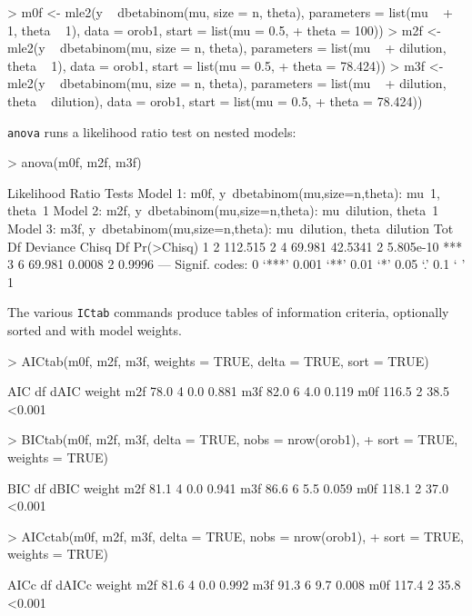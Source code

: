 \documentclass{article}
\newcommand{\code}[1]{{\tt #1}}
\begin{document}
\begin{Schunk}
\begin{Sinput}
> m0f <- mle2(y ~ dbetabinom(mu, size = n, theta), parameters = list(mu ~ 
+     1, theta ~ 1), data = orob1, start = list(mu = 0.5, 
+     theta = 100))
> m2f <- mle2(y ~ dbetabinom(mu, size = n, theta), parameters = list(mu ~ 
+     dilution, theta ~ 1), data = orob1, start = list(mu = 0.5, 
+     theta = 78.424))
> m3f <- mle2(y ~ dbetabinom(mu, size = n, theta), parameters = list(mu ~ 
+     dilution, theta ~ dilution), data = orob1, start = list(mu = 0.5, 
+     theta = 78.424))
\end{Sinput}
\end{Schunk}

\code{anova} runs a likelihood ratio test on nested
models:
\begin{Schunk}
\begin{Sinput}
> anova(m0f, m2f, m3f)
\end{Sinput}
\begin{Soutput}
Likelihood Ratio Tests
Model 1: m0f, y~dbetabinom(mu,size=n,theta): mu~1, theta~1
Model 2: m2f, y~dbetabinom(mu,size=n,theta): mu~dilution, theta~1
Model 3: m3f, y~dbetabinom(mu,size=n,theta): mu~dilution,
          theta~dilution
  Tot Df Deviance   Chisq Df Pr(>Chisq)    
1      2  112.515                          
2      4   69.981 42.5341  2  5.805e-10 ***
3      6   69.981  0.0008  2     0.9996    
---
Signif. codes:  0 ‘***’ 0.001 ‘**’ 0.01 ‘*’ 0.05 ‘.’ 0.1 ‘ ’ 1 
\end{Soutput}
\end{Schunk}

The various \code{ICtab} commands produce tables of
information criteria, optionally sorted and
with model weights.
\begin{Schunk}
\begin{Sinput}
> AICtab(m0f, m2f, m3f, weights = TRUE, delta = TRUE, sort = TRUE)
\end{Sinput}
\begin{Soutput}
    AIC   df dAIC  weight
m2f  78.0 4    0.0 0.881 
m3f  82.0 6    4.0 0.119 
m0f 116.5 2   38.5 <0.001
\end{Soutput}
\begin{Sinput}
> BICtab(m0f, m2f, m3f, delta = TRUE, nobs = nrow(orob1), 
+     sort = TRUE, weights = TRUE)
\end{Sinput}
\begin{Soutput}
    BIC   df dBIC  weight
m2f  81.1 4    0.0 0.941 
m3f  86.6 6    5.5 0.059 
m0f 118.1 2   37.0 <0.001
\end{Soutput}
\begin{Sinput}
> AICctab(m0f, m2f, m3f, delta = TRUE, nobs = nrow(orob1), 
+     sort = TRUE, weights = TRUE)
\end{Sinput}
\begin{Soutput}
    AICc  df dAICc weight
m2f  81.6 4    0.0 0.992 
m3f  91.3 6    9.7 0.008 
m0f 117.4 2   35.8 <0.001
\end{Soutput}
\end{Schunk}
\end{document}
